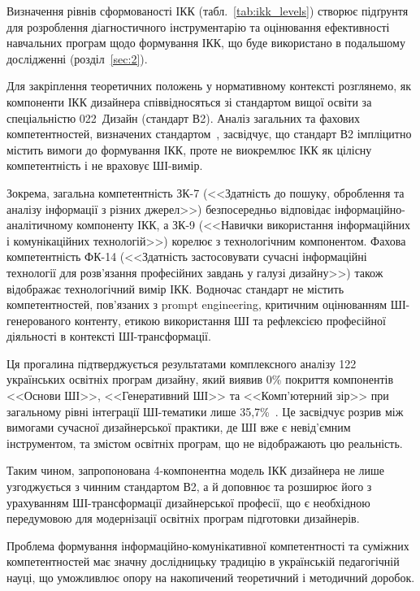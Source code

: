 Визначення рівнів сформованості ІКК (табл.~\ref{tab:ikk_levels}) створює підґрунтя для розроблення діагностичного інструментарію та оцінювання ефективності навчальних програм щодо формування ІКК, що буде використано в подальшому дослідженні (розділ~\ref{sec:2}).


Для закріплення теоретичних положень у нормативному контексті розглянемо, як компоненти ІКК дизайнера співвідносяться зі стандартом вищої освіти за спеціальністю 022~Дизайн (стандарт В2). Аналіз загальних та фахових компетентностей, визначених стандартом~\cite{Musiienko2025DesignEducation}, засвідчує, що стандарт В2 імпліцитно містить вимоги до формування ІКК, проте не виокремлює ІКК як цілісну компетентність і не враховує ШІ-вимір.

Зокрема, загальна компетентність ЗК-7 (<<Здатність до пошуку, оброблення та аналізу інформації з різних джерел>>) безпосередньо відповідає інформаційно-аналітичному компоненту ІКК, а ЗК-9 (<<Навички використання інформаційних і комунікаційних технологій>>) корелює з технологічним компонентом. Фахова компетентність ФК-14 (<<Здатність застосовувати сучасні інформаційні технології для розв'язання професійних завдань у галузі дизайну>>) також відображає технологічний вимір ІКК. Водночас стандарт не містить компетентностей, пов'язаних з prompt engineering, критичним оцінюванням ШІ-генерованого контенту, етикою використання ШІ та рефлексією професійної діяльності в контексті ШІ-трансформації.

Ця прогалина підтверджується результатами комплексного аналізу 122 українських освітніх програм дизайну, який виявив 0\% покриття компонентів <<Основи ШІ>>, <<Генеративний ШІ>> та <<Комп'ютерний зір>> при загальному рівні інтеграції ШІ-тематики лише 35,7\%~\cite{Musiienko2025DesignEducation}. Це засвідчує розрив між вимогами сучасної дизайнерської практики, де ШІ вже є невід'ємним інструментом, та змістом освітніх програм, що не відображають цю реальність.

Таким чином, запропонована 4-компонентна модель ІКК дизайнера не лише узгоджується з чинним стандартом В2, а й доповнює та розширює його з урахуванням ШІ-трансформації дизайнерської професії, що є необхідною передумовою для модернізації освітніх програм підготовки дизайнерів.


Проблема формування інформаційно-комунікативної компетентності та суміжних компетентностей має значну дослідницьку традицію в українській педагогічній науці, що уможливлює опору на накопичений теоретичний і методичний доробок.


